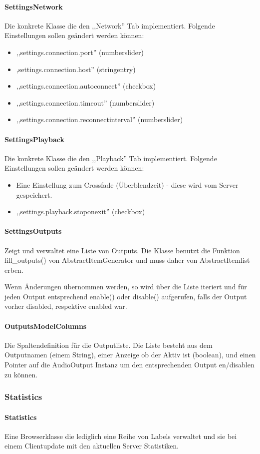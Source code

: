 \paragraph{SettingsNetwork}
Die konkrete Klasse die den ,,Network'' Tab implementiert.
Folgende Einstellungen sollen geändert werden können:
\begin{itemize}
\item ,,settings.connection.port'' (numberslider)
\item ,settings.connection.host'' (stringentry)
\item ,,settings.connection.autoconnect'' (checkbox)
\item ,,settings.connection.timeout'' (numberslider)
\item ,,settings.connection.reconnectinterval'' (numberslider)
\end{itemize}

\paragraph{SettingsPlayback}
Die konkrete Klasse die den ,,Playback'' Tab implementiert.
Folgende Einstellungen sollen geändert werden können:
\begin{itemize}
\item Eine Einstellung zum Crossfade (Überblendzeit) - diese wird vom Server gespeichert.
\item ,,settings.playback.stoponexit'' (checkbox)
\end{itemize}

\paragraph{SettingsOutputs}
Zeigt und verwaltet eine Liste von Outputs. Die Klasse benutzt die Funktion fill\_outputs() von AbstractItemGenerator
und muss daher von AbstractItemlist erben.

Wenn Änderungen übernommen werden, so wird über die Liste iteriert und für jeden Output entsprechend enable() oder disable() aufgerufen, 
falls der Output vorher disabled, respektive enabled war.

\paragraph{OutputsModelColumns}
Die Spaltendefinition für die Outputliste.
Die Liste besteht aus dem Outputnamen (einem String), einer Anzeige ob der Aktiv ist (boolean),
und einen Pointer auf die AudioOutput Instanz um den entsprechenden Output en/disablen zu können.

\subsubsection{Statistics}
\paragraph{Statistics}
Eine Browserklasse die lediglich eine Reihe von Labels verwaltet und sie bei einem Clientupdate mit den aktuellen Server Statistiken.


